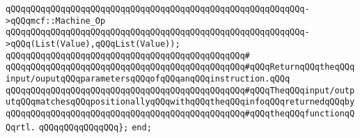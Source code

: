 \verb|qQQqqQQqqQQqqQQqqQQqqQQqqQQqqQQqqQQqqQQqqQQqqQQqqQQqqQQqqQQq->qQQqmcf::Machine_Op|\newline
\verb|qQQqqQQqqQQqqQQqqQQqqQQqqQQqqQQqqQQqqQQqqQQqqQQqqQQqqQQqqQQq->qQQq(List(Value),qQQqList(Value));|\newline
\verb|qQQqqQQqqQQqqQQqqQQqqQQqqQQqqQQqqQQqqQQqqQQqqQQq#|\newline
\verb|qQQqqQQqqQQqqQQqqQQqqQQqqQQqqQQqqQQqqQQqqQQqqQQq#qQQqReturnqQQqtheqQQqinput/ouputqQQqparametersqQQqofqQQqanqQQqinstruction.qQQq|\newline
\verb|qQQqqQQqqQQqqQQqqQQqqQQqqQQqqQQqqQQqqQQqqQQqqQQq#qQQqTheqQQqinput/outputqQQqmatchesqQQqpositionallyqQQqwithqQQqtheqQQqinfoqQQqreturnedqQQqby|\newline
\verb|qQQqqQQqqQQqqQQqqQQqqQQqqQQqqQQqqQQqqQQqqQQqqQQq#qQQqtheqQQqfunctionqQQqrtl.|\newline
\verb|qQQqqQQqqQQqqQQq};|\newline
\verb|end;|\newline

